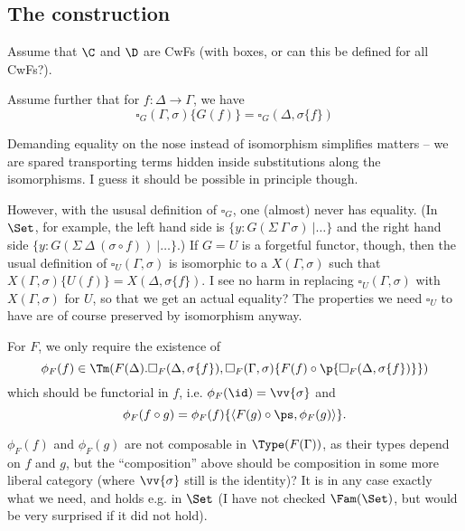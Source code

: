 \documentclass{article}
\newcommand{\isoGR}{\ensuremath{\phi_{G\rightarrow}}}
\newcommand{\isoGL}{\ensuremath{\phi_{G\leftarrow}}}
\newcommand{\isoFL}{\ensuremath{\phi_{F}}} %
\begin{document}
\subsection{The construction}

Assume that $\C$ and $\D$ are CwFs (with boxes, or can this be defined for all CwFs?).

 Assume further that for $f : \Delta \to \Gamma$, we have
 \[
 \square_G(\Gamma, \sigma)\{G(f)\} = \square_G(\Delta, \sigma\{f\})
 \]
\begin{remark}
  Demanding equality on the nose instead of isomorphism simplifies
  matters -- we are spared transporting terms hidden inside
  substitutions along the isomorphisms. I guess it should be possible
  in principle though.

  However, with the ususal definition of $\square_G$, one (almost)
  never has equality. (In $\Set$, for example, the left hand side is
  $\{ y : G(\Sigma\ \Gamma\ \sigma)\ |\ldots\}$ and the right hand
  side $\{ y : G(\Sigma\ \Delta\ (\sigma \circ f))\ |\ldots\}$.)  If
  $G = U$ is a forgetful functor, though, then the usual definition of
  $\square_U(\Gamma, \sigma)$ is isomorphic to a $X(\Gamma, \sigma)$
  such that $X(\Gamma, \sigma)\{U(f)\} = X(\Delta, \sigma\{f\})$. I
  see no harm in replacing $\square_U(\Gamma, \sigma)$ with $X(\Gamma,
  \sigma)$ for $U$, so that we get an actual equality? The properties
  we need $\square_U$ to have are of course preserved by isomorphism
  anyway.
\end{remark}
%
For $F$, we only require the existence of
\[
\isoFL(f) \in \Tm(F(\Delta).\square_F(\Delta, \sigma\{f\}),
\square_F(\Gamma, \sigma)\{F(f) \circ \p{\square_F(\Delta,
  \sigma\{f\})}\})
\]
which should be functorial in $f$, i.e. $\isoFL(\id) = \vv{\sigma}$
and 
\[
\isoFL(f \circ g) = \isoFL(f)\{\langle F(g) \circ \ps, \isoFL(g)\rangle\}.
\]

\begin{remark}
  $\isoFL(f)$ and $\isoFL(g)$ are not composable in
  $\Type(F(\Gamma))$, as their types depend on $f$ and $g$, but the
  ``composition'' above should be composition in some more liberal
  category (where $\vv{\sigma}$ still is the identity)? It is in any
  case exactly what we need, and holds e.g. in $\Set$ (I
  have not checked $\Fam(\Set)$, but would be very surprised if it did
  not hold).
\end{remark}
\end{document}
